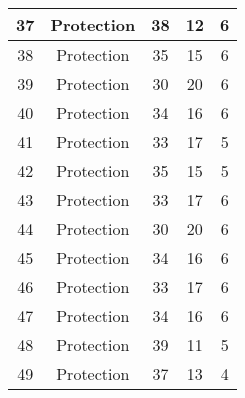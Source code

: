 \documentclass[results.tex]{subfiles}
\begin{document}
\begin{center}
\begin{tabular}{| c || c | c | c | c |}
            \hline
            37                      & Protection                   & 38                     & 12                      & 6                    \\
            \hline
            38                      & Protection                   & 35                     & 15                      & 6                    \\
            \hline
            39                      & Protection                   & 30                     & 20                      & 6                    \\
            \hline
            40                      & Protection                   & 34                     & 16                      & 6                    \\
            \hline
            41                      & Protection                   & 33                     & 17                      & 5                    \\
            \hline
            42                      & Protection                   & 35                     & 15                      & 5                    \\
            \hline
            43                      & Protection                   & 33                     & 17                      & 6                    \\
            \hline
            44                      & Protection                   & 30                     & 20                      & 6                    \\
            \hline
            45                      & Protection                   & 34                     & 16                      & 6                    \\
            \hline
            46                      & Protection                   & 33                     & 17                      & 6                    \\
            \hline
            47                      & Protection                   & 34                     & 16                      & 6                    \\
            \hline
            48                      & Protection                   & 39                     & 11                      & 5                    \\
            \hline
            49                      & Protection                   & 37                     & 13                      & 4                    \\
            \hline
        \end{tabular}
    \end{center}
\end{document}
